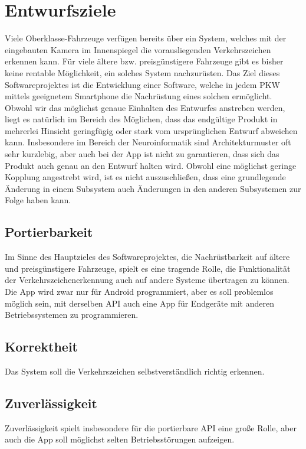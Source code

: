\documentclass[12pt,a4paper,ngerman,enabledeprecatedfontcommands]{scrreprt}
\begin{document}
\chapter{Entwurfsziele}
Viele Oberklasse-Fahrzeuge verfügen bereits über ein System, welches mit der eingebauten Kamera im Innenspiegel die vorausliegenden Verkehrszeichen erkennen kann. Für viele ältere bzw. preisgünstigere Fahrzeuge gibt es bisher keine rentable Möglichkeit, ein solches \gls{System} nachzurüsten. Das Ziel dieses Softwareprojektes ist die Entwicklung einer Software, welche in jedem PKW mittels geeignetem \gls{Smartphone} die Nachrüstung eines solchen  ermöglicht.\\
Obwohl wir das möglichst genaue Einhalten des Entwurfes anstreben werden, liegt es natürlich im Bereich des Möglichen, dass das endgültige \gls{Produkt} in mehrerlei Hinsicht geringfügig oder stark vom ursprünglichen Entwurf abweichen kann. Insbesondere im Bereich der Neuroinformatik sind Architekturmuster oft sehr kurzlebig, aber auch bei der \gls{App} ist nicht zu garantieren, dass sich das \gls{Produkt} auch genau an den Entwurf halten wird. Obwohl eine möglichst geringe Kopplung angestrebt wird, ist es nicht auszuschließen, dass eine grundlegende Änderung in einem Subsystem auch Änderungen in den anderen Subsystemen zur Folge haben kann.\\

\section{Portierbarkeit}
Im Sinne des Hauptzieles des Softwareprojektes, die Nachrüstbarkeit auf ältere und preisgünstigere Fahrzeuge, spielt es eine tragende Rolle, die Funktionalität der Verkehrszeichenerkennung auch auf andere Systeme übertragen zu können. Die \gls{App} wird zwar nur für Android programmiert, aber es soll problemlos möglich sein, mit derselben \gls{API} auch eine \gls{App} für Endgeräte mit anderen Betriebssystemen zu programmieren.\\

\section{Korrektheit} Das \gls{System} soll die Verkehrszeichen selbstverständlich richtig erkennen.\\

\section{Zuverlässigkeit} Zuverlässigkeit spielt insbesondere für die portierbare \gls{API} eine große Rolle, aber auch die \gls{App} soll möglichst selten Betriebsstörungen aufzeigen.\\
\end{document}
